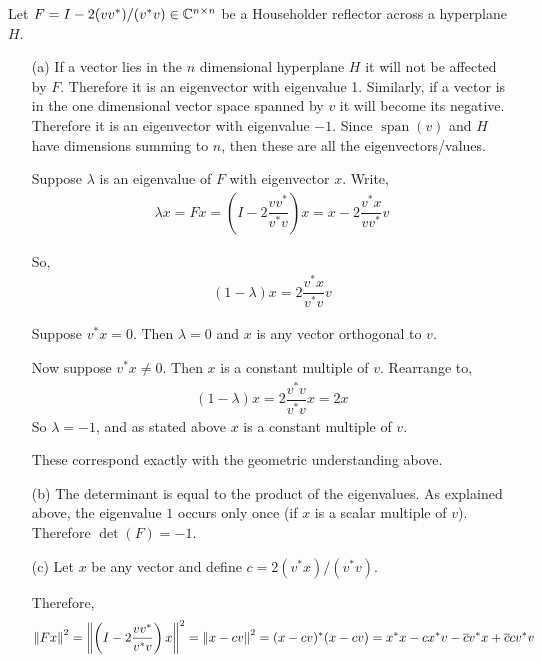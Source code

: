 \documentclass[10pt]{article}
\begin{document}
\begin{solution}[Solution]
    Let \( F=I-2(vv^*)/(v^*v)\in\mathbb{C}^{n\times n} \) be a Householder reflector across a hyperplane \( H \).

\begin{enumerate}
    \item[(a)] If a vector lies in the \( n \) dimensional hyperplane \( H \) it will not be affected by \( F \). Therefore it is an eigenvector with eigenvalue 1. Similarly, if a vector is in the one dimensional vector space spanned by \( v \) it will become its negative. Therefore it is an eigenvector with eigenvalue \( -1 \). Since \( \operatorname{span}(v) \) and \( H \) have dimensions summing to \( n \), then these are all the eigenvectors/values.

        Suppose \( \lambda \) is an eigenvalue of \( F \) with eigenvector \( x \). Write,
        \begin{align*}
            \lambda x = Fx=\left(I-2 \dfrac{vv^*}{v^*v}\right)x = x-2 \dfrac{v^*x}{vv^*} v
        \end{align*}

        So,
        \begin{align*}
            (1-\lambda)x=2 \dfrac{v^*x}{v^*v} v
        \end{align*}

        Suppose \( v^*x=0 \). Then \( \lambda = 0 \) and \( x \) is any vector orthogonal to \( v \).

        Now suppose \( v^*x\neq 0 \). Then \( x \) is a constant multiple of \( v \). Rearrange to,
        \begin{align*}
            (1-\lambda)x=2 \dfrac{v^*v}{v^*v}x = 2x
        \end{align*}
        So \( \lambda=-1 \), and as stated above \( x \) is a constant multiple of \( v \). 

        These correspond exactly with the geometric understanding above.

    \item[(b)]
        The determinant is equal to the product of the eigenvalues. As explained above, the eigenvalue \( 1 \) occurs only once (if \( x \) is a scalar multiple of \( v \)). Therefore \( \det(F)=-1 \).

    \item[(c)]
        Let \( x \) be any vector and define \( c=2(v^*x)/(v^*v) \).

        Therefore,
        \begin{align*}
            \left\lVert Fx\right\rVert^2 = \left\lVert\left(I-2\dfrac{vv^*}{v^*v}\right)x\right\rVert^2 = \left\lVert x-cv\right\rVert^2 = (x-cv)^*(x-cv) = x^*x-cx^*v-\overline{c}v^*x+\overline{c}cv^*v
        \end{align*}


\end{enumerate}
\end{solution}
\end{document}
